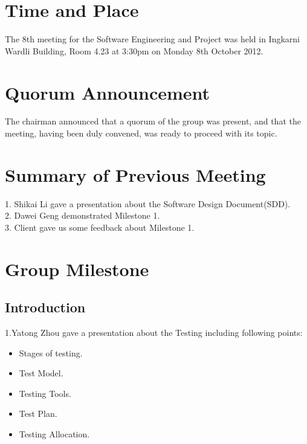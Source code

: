 \documentclass[11pt, a4paper]{article}
\begin{document}
\section{Time and Place}
The 8th meeting for the Software Engineering and Project was held in Ingkarni Wardli Building, Room     4.23 at 3:30pm on Monday 8th October 2012.

\section{Quorum Announcement}
The chairman announced that a quorum of the group was present, and that the meeting, having been duly convened, was ready to proceed with its topic.

\section{Summary of Previous Meeting}
1. Shikai Li gave a presentation about the Software Design Document(SDD).\\
2. Dawei Geng demonstrated Milestone 1.\\
3. Client gave us some feedback about Milestone 1.\\


\section{Group Milestone}

\subsection{Introduction}
1.Yatong Zhou gave a presentation about the Testing including following points:
\begin{itemize}
\item Stages of testing.
\item Test Model.
\item Testing Tools.
\item Test Plan.
\item Testing Allocation.
\end{itemize}
\end{document}
